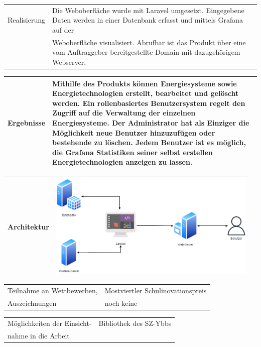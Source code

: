 \begin{tabular}{|p{\feldC}|p{\feldD}|}
 \hline
 Realisierung & Die Weboberfläche wurde mit Laravel umgesetzt. Eingegebene Daten werden in einer Datenbank erfasst und mittels Grafana auf der \\&Weboberfläche visualisiert. Abrufbar ist das Produkt über eine vom Auftraggeber bereitgestellte Domain mit dazugehörigem Webserver.  \\
 \hline
\end{tabular}

\begin{tabular}{|p{\feldC}|p{\feldD}|}
 \hline
 Ergebnisse &  Mithilfe des Produkts können Energiesysteme sowie Energietechnologien erstellt, bearbeitet und gelöscht werden. Ein rollenbasiertes Benutzersystem regelt den Zugriff auf die Verwaltung der einzelnen Energiesysteme. Der Administrator hat als Einziger die Möglichkeit neue Benutzer hinzuzufügen oder bestehende zu löschen. Jedem Benutzer ist es möglich, die Grafana Statistiken seiner selbst erstellen Energietechnologien anzeigen zu lassen.\\
 \hline
\end{tabular}

\begin{tabular}{|p{\feldC}|p{\feldD}|}
 \hline
 Architektur &   \includegraphics[height=5cm]{images/Architektur}\\ 
 
 
 \hline
\end{tabular}


\begin{tabular}{|p{\feldC}|p{\feldD}|}
 \hline
 Teilnahme an Wettbewerben, & Mostviertler Schulinovationspreis \\
 Auszeichnungen & noch keine\\
 \hline
\end{tabular}

\begin{tabular}{|p{\feldC}|p{\feldD}|}
 \hline
 Möglichkeiten der Einsicht- & Bibliothek des SZ-Ybbs \\
 nahme in die Arbeit & \\
 \hline
\end{tabular}

